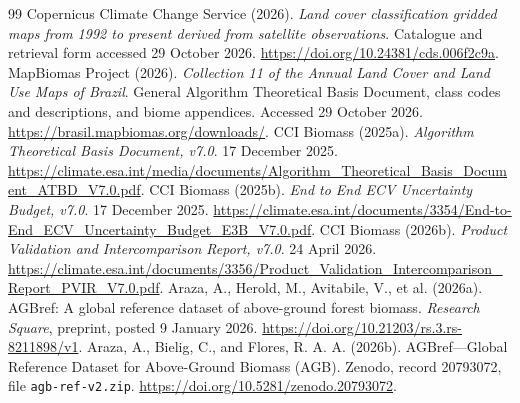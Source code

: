 \documentclass[11pt,a4paper]{article}
\begin{document}
\begin{thebibliography}{99}
 Copernicus Climate Change Service (2026). \emph{Land cover classification gridded maps from 1992 to present derived from satellite observations}. Catalogue and retrieval form accessed 29 October 2026. \url{https://doi.org/10.24381/cds.006f2c9a}.
 MapBiomas Project (2026). \emph{Collection 11 of the Annual Land Cover and Land Use Maps of Brazil}. General Algorithm Theoretical Basis Document, class codes and descriptions, and biome appendices. Accessed 29 October 2026. \url{https://brasil.mapbiomas.org/downloads/}.
 CCI Biomass (2025a). \emph{Algorithm Theoretical Basis Document, v7.0}. 17 December 2025. \url{https://climate.esa.int/media/documents/Algorithm_Theoretical_Basis_Document_ATBD_V7.0.pdf}.
 CCI Biomass (2025b). \emph{End to End ECV Uncertainty Budget, v7.0}. 17 December 2025. \url{https://climate.esa.int/documents/3354/End-to-End_ECV_Uncertainty_Budget_E3B_V7.0.pdf}.
 CCI Biomass (2026b). \emph{Product Validation and Intercomparison Report, v7.0}. 24 April 2026. \url{https://climate.esa.int/documents/3356/Product_Validation_Intercomparison_Report_PVIR_V7.0.pdf}.
 Araza, A., Herold, M., Avitabile, V., et al. (2026a). AGBref: A global reference dataset of above-ground forest biomass. \emph{Research Square}, preprint, posted 9 January 2026. \url{https://doi.org/10.21203/rs.3.rs-8211898/v1}.
 Araza, A., Bielig, C., and Flores, R. A. A. (2026b). AGBref---Global Reference Dataset for Above-Ground Biomass (AGB). Zenodo, record 20793072, file \texttt{agb-ref-v2.zip}. \url{https://doi.org/10.5281/zenodo.20793072}.


\end{thebibliography}
\end{document}
